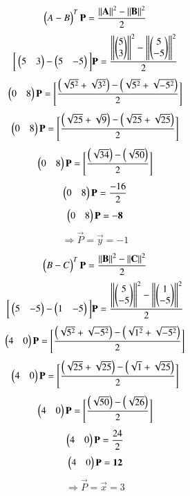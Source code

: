 \documentclass[journal,12pt,twocolumn]{IEEEtran}
\begin{document}
\begin{align}
    \begin{pmatrix}A-B\end{pmatrix}^T\mathbf{P} = \frac{\left\lVert\mathbf{A}\right\rVert^2-\left\lVert\mathbf{B}\right\rVert^2}{{2}}
\end{align} 
\begin{align}
    \bigg[\begin{pmatrix}5&3\end{pmatrix} - \begin{pmatrix}5&-5\end{pmatrix}\bigg]\mathbf{P}= \frac{\left\lVert\begin{pmatrix}5\\3\end{pmatrix}\right\rVert^2-\left\lVert\begin{pmatrix}5\\-5\end{pmatrix}\right\rVert^2}{2}
\end{align}
    \begin{align}
        \begin{pmatrix}0&8\end{pmatrix}\mathbf{P}=\Bigg[\frac{\begin{pmatrix}\sqrt{5^2}+\sqrt{3^2}\end{pmatrix} -\begin{pmatrix}\sqrt{5^2}+\sqrt{-5^2}\end{pmatrix}}{2}\Bigg]
    \end{align}
    \begin{align}
        \begin{pmatrix}0&8\end{pmatrix}\mathbf{P}=\Bigg[\frac{\begin{pmatrix}\sqrt{25}+\sqrt{9}\end{pmatrix} -\begin{pmatrix}\sqrt{25}+\sqrt{25}\end{pmatrix}}{2}\Bigg]
    \end{align}
    \begin{align}
        \begin{pmatrix}0&8\end{pmatrix}\mathbf{P}=\Bigg[\frac{\begin{pmatrix}\sqrt{34}\end{pmatrix} -\begin{pmatrix}\sqrt{50}\end{pmatrix}}{2}\Bigg]
    \end{align}
    \begin{align}
        \begin{pmatrix}0&8\end{pmatrix}\mathbf{P}=\frac{-16}{2}
    \end{align}
    \begin{align}
        \begin{pmatrix}0&8\end{pmatrix}\mathbf{P}=\mathbf{-8}
    \end{align}
    \begin{align}
        \Longrightarrow\vec{P}=\vec{y}=-1
    \end{align}
\begin{align}
    \begin{pmatrix}B-C\end{pmatrix}^T\mathbf{P} = \frac{\left\lVert\mathbf{B}\right\rVert^2-\left\lVert\mathbf{C}\right\rVert^2}{{2}}
\end{align}
\begin{align}
    \bigg[\begin{pmatrix}5&-5\end{pmatrix} - \begin{pmatrix}1&-5\end{pmatrix}\bigg]\mathbf{P}= \frac{\left\lVert\begin{pmatrix}5\\-5\end{pmatrix}\right\rVert^2-\left\lVert\begin{pmatrix}1\\-5\end{pmatrix}\right\rVert^2}{2}
\end{align}
    \begin{align}
        \begin{pmatrix}4&0\end{pmatrix}\mathbf{P}=\Bigg[\frac{\begin{pmatrix}\sqrt{5^2}+\sqrt{-5^2}\end{pmatrix} -\begin{pmatrix}\sqrt{1^2}+\sqrt{-5^2}\end{pmatrix}}{2}\Bigg]
    \end{align}
    \begin{align}
        \begin{pmatrix}4&0\end{pmatrix}\mathbf{P}=\Bigg[\frac{\begin{pmatrix}\sqrt{25}+\sqrt{25}\end{pmatrix} -\begin{pmatrix}\sqrt{1}+\sqrt{25}\end{pmatrix}}{2}\Bigg]
    \end{align}
    \begin{align}
        \begin{pmatrix}4&0\end{pmatrix}\mathbf{P}=\Bigg[\frac{\begin{pmatrix}\sqrt{50}\end{pmatrix} -\begin{pmatrix}\sqrt{26}\end{pmatrix}}{2}\Bigg]
    \end{align}
    \begin{align}
        \begin{pmatrix}4&0\end{pmatrix}\mathbf{P}=\frac{24}{2}
    \end{align}
    \begin{align}
        \begin{pmatrix}4&0\end{pmatrix}\mathbf{P}=\mathbf{12}
    \end{align}
    \begin{align}
         \Longrightarrow\vec{P}=\vec{x}=3
    \end{align}
\end{document}
